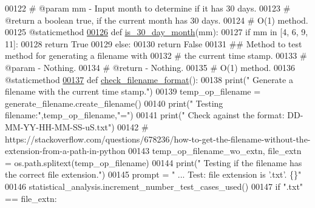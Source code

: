 \begin{DoxyCode}
00122     \textcolor{comment}{#   @param mm - Input month to determine if it has 30 days.}
00123     \textcolor{comment}{#   @return a boolean true, if the current month has 30 days.}
00124     \textcolor{comment}{#   O(1) method.}
00125     @staticmethod
\hypertarget{generate__results__filename__tester_8py_source_l00126}{}\hyperlink{classutilities_1_1generate__results__filename__tester_1_1generate__filename__tester_a7aae79997134dc7250949e725d92aedf}{00126}     \textcolor{keyword}{def }\hyperlink{classutilities_1_1generate__results__filename__tester_1_1generate__filename__tester_a7aae79997134dc7250949e725d92aedf}{is\_30\_day\_month}(mm):
00127         \textcolor{keywordflow}{if} mm \textcolor{keywordflow}{in} [4, 6, 9, 11]:
00128             \textcolor{keywordflow}{return} \textcolor{keyword}{True}
00129         \textcolor{keywordflow}{else}:
00130             \textcolor{keywordflow}{return} \textcolor{keyword}{False}
00131     \textcolor{comment}{##  Method to test method for generating a filename with}
00132     \textcolor{comment}{#       the current time stamp.}
00133     \textcolor{comment}{#   @param - Nothing.}
00134     \textcolor{comment}{#   @return - Nothing.}
00135     \textcolor{comment}{#   O(1) method.}
00136     @staticmethod
\hypertarget{generate__results__filename__tester_8py_source_l00137}{}\hyperlink{classutilities_1_1generate__results__filename__tester_1_1generate__filename__tester_a4b73142b6465894e81a1393e829abee2}{00137}     \textcolor{keyword}{def }\hyperlink{classutilities_1_1generate__results__filename__tester_1_1generate__filename__tester_a4b73142b6465894e81a1393e829abee2}{check\_filename\_format}():
00138         print(\textcolor{stringliteral}{" Generate a filename with the current time stamp."})
00139         temp\_op\_filename = generate\_filename.create\_filename()
00140         print(\textcolor{stringliteral}{" Testing filename:"},temp\_op\_filename,\textcolor{stringliteral}{"="})
00141         print(\textcolor{stringliteral}{" Check against the format: DD-MM-YY-HH-MM-SS-uS.txt"})
00142         \textcolor{comment}{#
       https://stackoverflow.com/questions/678236/how-to-get-the-filename-without-the-extension-from-a-path-in-python}
00143         temp\_op\_filename\_wo\_extn, file\_extn = os.path.splitext(temp\_op\_filename)
00144         print(\textcolor{stringliteral}{" Testing if the filename has the correct file extension."})
00145         prompt = \textcolor{stringliteral}{"  ... Test: file extension is '.txt'.         \{\}"}
00146         statistical\_analysis.increment\_number\_test\_cases\_used()
00147         \textcolor{keywordflow}{if} \textcolor{stringliteral}{".txt"} == file\_extn:

\end{DoxyCode}

